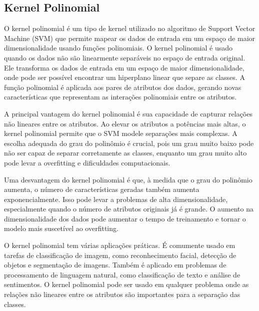 \documentclass[12pt,oneside,a4paper,chapter=TITLE,
			   english,brazil]{abntex2}
\begin{document}
\subsection{Kernel Polinomial}


O kernel polinomial é um tipo de kernel utilizado no algoritmo de Support Vector Machine (SVM) que permite mapear os dados de entrada em um espaço de maior dimensionalidade usando funções polinomiais. O kernel polinomial é usado quando os dados não são linearmente separáveis no espaço de entrada original. Ele transforma os dados de entrada em um espaço de maior dimensionalidade, onde pode ser possível encontrar um hiperplano linear que separe as classes. A função polinomial é aplicada aos pares de atributos dos dados, gerando novas características que representam as interações polinomiais entre os atributos.

A principal vantagem do kernel polinomial é sua capacidade de capturar relações não lineares entre os atributos. Ao elevar os atributos a potências mais altas, o kernel polinomial permite que o SVM modele separações mais complexas. A escolha adequada do grau do polinômio é crucial, pois um grau muito baixo pode não ser capaz de separar corretamente as classes, enquanto um grau muito alto pode levar a overfitting e dificuldades computacionais.

Uma desvantagem do kernel polinomial é que, à medida que o grau do polinômio aumenta, o número de características geradas também aumenta exponencialmente. Isso pode levar a problemas de alta dimensionalidade, especialmente quando o número de atributos originais já é grande. O aumento na dimensionalidade dos dados pode aumentar o tempo de treinamento e tornar o modelo mais suscetível ao overfitting.

O kernel polinomial tem várias aplicações práticas. É comumente usado em tarefas de classificação de imagem, como reconhecimento facial, detecção de objetos e segmentação de imagens. Também é aplicado em problemas de processamento de linguagem natural, como classificação de texto e análise de sentimentos. O kernel polinomial pode ser usado em qualquer problema onde as relações não lineares entre os atributos são importantes para a separação das classes. %

\end{document}
